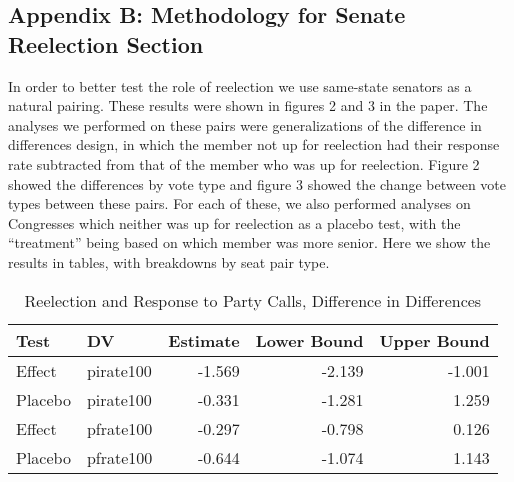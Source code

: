 \documentclass[12pt]{article}
\begin{document}
\subsection{Appendix B: Methodology for Senate Reelection Section}

In order to better test the role of reelection we use same-state senators as a natural pairing. These results were shown in figures 2 and 3 in the paper. The analyses we performed on these pairs were generalizations of the difference in differences design, in which the member not up for reelection had their response rate subtracted from that of the member who was up for reelection. Figure 2 showed the differences by vote type and figure 3 showed the change between vote types between these pairs. For each of these, we also performed analyses on Congresses which neither was up for reelection as a placebo test, with the ``treatment'' being based on which member was more senior. Here we show the results in tables, with breakdowns by seat pair type.

\begin{table}[H]
	\centering
	\singlespacing
	\caption{Reelection and Response to Party Calls, Difference in Differences} 
	\begin{tabular}{llrrr}
		\hline
		Test & DV & Estimate & Lower Bound & Upper Bound \\ 
		\hline
		Effect & pirate100 & -1.569 & -2.139 & -1.001 \\ 
		Placebo & pirate100 & -0.331 & -1.281 & 1.259 \\ 
		Effect & pfrate100 & -0.297 & -0.798 & 0.126 \\ 
		Placebo & pfrate100 & -0.644 & -1.074 & 1.143 \\ 
		\hline
	\end{tabular}
\end{table}
\end{document}

